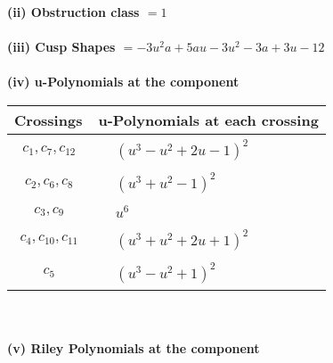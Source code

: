 \documentclass[1p]{elsarticle_modified}
\theoremstyle{definition}
\begin{document}
\flushleft \textbf{(ii) Obstruction class $= 1$}\\~\\
\flushleft \textbf{(iii) Cusp Shapes $= -3 u^2 a+5 a u-3 u^2-3 a+3 u-12$}\\~\\
\newpage\renewcommand{\arraystretch}{1}
\flushleft \textbf{(iv) u-Polynomials at the component}\newline \\
\begin{tabular}{m{50pt}|m{274pt}}
Crossings & \hspace{64pt}u-Polynomials at each crossing \\
\hline $$\begin{aligned}c_{1},c_{7},c_{12}\end{aligned}$$&$\begin{aligned}
&(u^3- u^2+2 u-1)^2
\end{aligned}$\\
\hline $$\begin{aligned}c_{2},c_{6},c_{8}\end{aligned}$$&$\begin{aligned}
&(u^3+u^2-1)^2
\end{aligned}$\\
\hline $$\begin{aligned}c_{3},c_{9}\end{aligned}$$&$\begin{aligned}
&u^6
\end{aligned}$\\
\hline $$\begin{aligned}c_{4},c_{10},c_{11}\end{aligned}$$&$\begin{aligned}
&(u^3+u^2+2 u+1)^2
\end{aligned}$\\
\hline $$\begin{aligned}c_{5}\end{aligned}$$&$\begin{aligned}
&(u^3- u^2+1)^2
\end{aligned}$\\
\hline
\end{tabular}\\~\\
\newpage\renewcommand{\arraystretch}{1}
\flushleft \textbf{(v) Riley Polynomials at the component}\newline \\
\end{document}
